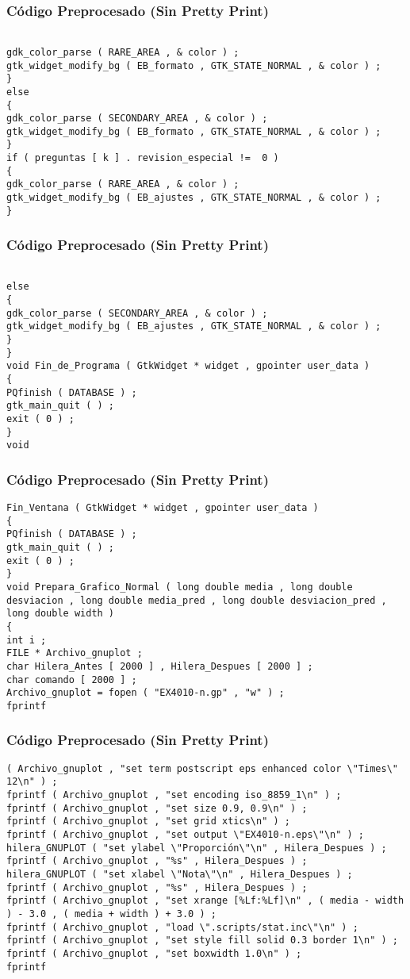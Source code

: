 \documentclass{beamer}
\begin{document}
\begin{frame}[fragile]
\frametitle{C\'odigo Preprocesado (Sin Pretty Print)}
\begin{lstlisting}[style=CStyle]

gdk_color_parse ( RARE_AREA , & color ) ; 
gtk_widget_modify_bg ( EB_formato , GTK_STATE_NORMAL , & color ) ; 
} 
else 
{ 
gdk_color_parse ( SECONDARY_AREA , & color ) ; 
gtk_widget_modify_bg ( EB_formato , GTK_STATE_NORMAL , & color ) ; 
} 
if ( preguntas [ k ] . revision_especial !=  0 ) 
{ 
gdk_color_parse ( RARE_AREA , & color ) ; 
gtk_widget_modify_bg ( EB_ajustes , GTK_STATE_NORMAL , & color ) ; 
} \end{lstlisting}
\end{frame}
\begin{frame}[fragile]
\frametitle{C\'odigo Preprocesado (Sin Pretty Print)}
\begin{lstlisting}[style=CStyle]

else 
{ 
gdk_color_parse ( SECONDARY_AREA , & color ) ; 
gtk_widget_modify_bg ( EB_ajustes , GTK_STATE_NORMAL , & color ) ; 
} 
} 
void Fin_de_Programa ( GtkWidget * widget , gpointer user_data ) 
{ 
PQfinish ( DATABASE ) ; 
gtk_main_quit ( ) ; 
exit ( 0 ) ; 
} 
void \end{lstlisting}
\end{frame}
\begin{frame}[fragile]
\frametitle{C\'odigo Preprocesado (Sin Pretty Print)}
\begin{lstlisting}[style=CStyle]
Fin_Ventana ( GtkWidget * widget , gpointer user_data ) 
{ 
PQfinish ( DATABASE ) ; 
gtk_main_quit ( ) ; 
exit ( 0 ) ; 
} 
void Prepara_Grafico_Normal ( long double media , long double desviacion , long double media_pred , long double desviacion_pred , long double width ) 
{ 
int i ; 
FILE * Archivo_gnuplot ; 
char Hilera_Antes [ 2000 ] , Hilera_Despues [ 2000 ] ; 
char comando [ 2000 ] ; 
Archivo_gnuplot = fopen ( "EX4010-n.gp" , "w" ) ; 
fprintf \end{lstlisting}
\end{frame}
\begin{frame}[fragile]
\frametitle{C\'odigo Preprocesado (Sin Pretty Print)}
\begin{lstlisting}[style=CStyle]
( Archivo_gnuplot , "set term postscript eps enhanced color \"Times\" 12\n" ) ; 
fprintf ( Archivo_gnuplot , "set encoding iso_8859_1\n" ) ; 
fprintf ( Archivo_gnuplot , "set size 0.9, 0.9\n" ) ; 
fprintf ( Archivo_gnuplot , "set grid xtics\n" ) ; 
fprintf ( Archivo_gnuplot , "set output \"EX4010-n.eps\"\n" ) ; 
hilera_GNUPLOT ( "set ylabel \"Proporción\"\n" , Hilera_Despues ) ; 
fprintf ( Archivo_gnuplot , "%s" , Hilera_Despues ) ; 
hilera_GNUPLOT ( "set xlabel \"Nota\"\n" , Hilera_Despues ) ; 
fprintf ( Archivo_gnuplot , "%s" , Hilera_Despues ) ; 
fprintf ( Archivo_gnuplot , "set xrange [%Lf:%Lf]\n" , ( media - width ) - 3.0 , ( media + width ) + 3.0 ) ; 
fprintf ( Archivo_gnuplot , "load \".scripts/stat.inc\"\n" ) ; 
fprintf ( Archivo_gnuplot , "set style fill solid 0.3 border 1\n" ) ; 
fprintf ( Archivo_gnuplot , "set boxwidth 1.0\n" ) ; 
fprintf \end{lstlisting}
\end{frame}
\end{document}
